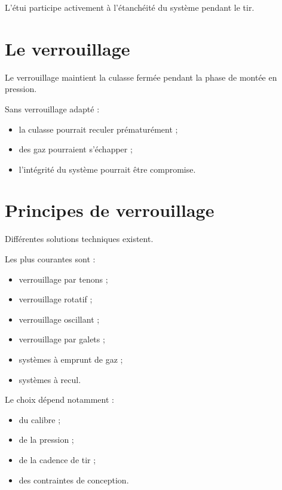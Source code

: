 \begin{aretenir}

L'étui participe activement à l'étanchéité du système pendant le tir.

\end{aretenir}

\section{Le verrouillage}

Le verrouillage maintient la culasse fermée pendant la phase de montée en
pression.

Sans verrouillage adapté :

\begin{itemize}
    \item la culasse pourrait reculer prématurément ;
    \item des gaz pourraient s'échapper ;
    \item l'intégrité du système pourrait être compromise.
\end{itemize}

\section{Principes de verrouillage}

Différentes solutions techniques existent.

Les plus courantes sont :

\begin{itemize}
    \item verrouillage par tenons ;
    \item verrouillage rotatif ;
    \item verrouillage oscillant ;
    \item verrouillage par galets ;
    \item systèmes à emprunt de gaz ;
    \item systèmes à recul.
\end{itemize}

Le choix dépend notamment :

\begin{itemize}
    \item du calibre ;
    \item de la pression ;
    \item de la cadence de tir ;
    \item des contraintes de conception.
\end{itemize}

